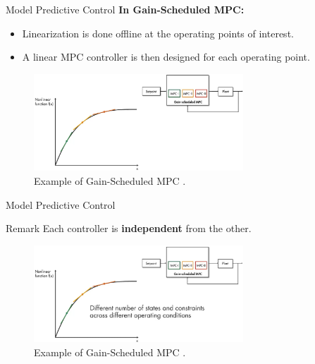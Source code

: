 \documentclass{thesisbeamer}
\begin{document}
\begin{frame}{Model Predictive Control} \vspace{4pt}
\textbf{In Gain-Scheduled MPC:}
\begin{itemize}
	\item Linearization is done offline at the operating points of interest.
	\item A linear MPC controller is then designed for each operating point.
\end{itemize}

\begin{figure}
	\centering	\includegraphics[width=0.7\textwidth]{Images/Control/MPC_gain_a}
	\caption{Example of Gain-Scheduled MPC \cite{MathWorks_adaptive}.}
\end{figure}
\end{frame}

\begin{frame}{Model Predictive Control} \vspace{4pt}
\begin{alertblock}{Remark}
\vspace{0.5em}
Each controller is \textbf{independent} from the other.
\vspace{0.5em}
\end{alertblock}

\begin{figure}
	\centering	\includegraphics[width=0.7\textwidth]{Images/Control/MPC_gain_b}
	\caption{Example of Gain-Scheduled MPC \cite{MathWorks_adaptive}.}
\end{figure}

\end{frame}
\end{document}
